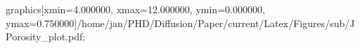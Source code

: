 graphics[xmin=4.000000, xmax=12.000000, ymin=0.000000, ymax=0.750000]{/home/jan/PHD/Diffusion/Paper/current/Latex/Figures/sub/JPorosity_plot.pdf}; 
